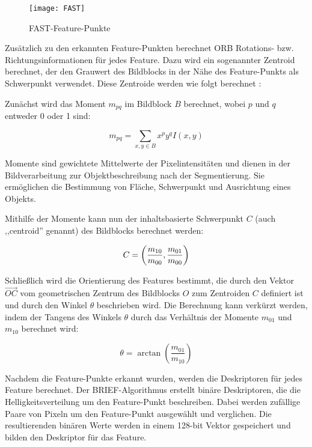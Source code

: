 \begin{figure}
    \centering
    \texttt{[image: FAST]}
    \caption{FAST-Feature-Punkte \cite{rosten2006fast}\label{fig:FAST}}\par
\end{figure}

Zusätzlich zu den erkannten Feature-Punkten berechnet ORB Rotations- bzw. Richtungsinformationen für jedes Feature. Dazu wird ein sogenannter Zentroid berechnet, der den Grauwert des Bildblocks in der Nähe des Feature-Punkts als Schwerpunkt verwendet. Diese Zentroide werden wie folgt berechnet \cite{gao2021vSLAM, rublee2011orb}:

Zunächst wird das Moment \( m_{pq} \) im Bildblock \( B \) berechnet, wobei \( p \) und \( q \) entweder 0 oder 1 sind:

\begin{equation}
    m_{pq} = \sum_{x,y \in B} x^p y^q I(x, y)
\end{equation}

\begin{tcolorbox}[colback=THAi-Blue!20!white, colframe=THAi-Blue]
    Momente sind gewichtete Mittelwerte der Pixelintensitäten und dienen in der Bildverarbeitung zur Objektbeschreibung nach der Segmentierung. Sie ermöglichen die Bestimmung von Fläche, Schwerpunkt und Ausrichtung eines Objekts.
\end{tcolorbox}

Mithilfe der Momente kann nun der inhaltsbasierte Schwerpunkt \( C \) (auch ,,centroid'' genannt) des Bildblocks berechnet werden:

\begin{equation}
C = 
\left(
\frac{m_{10}}{m_{00}}, \\
\frac{m_{01}}{m_{00}}
\right)
\end{equation}

Schließlich wird die Orientierung des Features bestimmt, die durch den Vektor \( \overrightarrow{OC} \) vom geometrischen Zentrum des Bildblocks \( O \) zum Zentroiden \( C \) definiert ist und durch den Winkel \( \theta \) beschrieben wird. Die Berechnung kann verkürzt werden, indem der Tangens des Winkels \( \theta \) durch das Verhältnis der Momente \( m_{01} \) und \( m_{10} \) berechnet wird:

\begin{equation}
    \theta = \arctan \left( \frac{m_{01}}{m_{10}} \right)
\end{equation}

Nachdem die Feature-Punkte erkannt wurden, werden die Deskriptoren für jedes Feature berechnet. Der BRIEF-Algorithmus erstellt binäre Deskriptoren, die die Helligkeitsverteilung um den Feature-Punkt beschreiben. Dabei werden zufällige Paare von Pixeln um den Feature-Punkt ausgewählt und verglichen. Die resultierenden binären Werte werden in einem 128-bit Vektor gespeichert und bilden den Deskriptor für das Feature. \cite{gao2021vSLAM, calonder2010brief}

